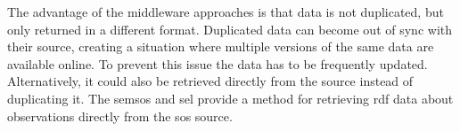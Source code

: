 The advantage of the middleware approaches is that data is not duplicated, but only returned in a different format. Duplicated data can become out of sync with their source, creating a situation where multiple versions of the same data are available online. To prevent this issue the data has to be frequently updated. Alternatively, it could also be retrieved directly from the source instead of duplicating it. The \ac{semsos} and \ac{sel} provide a method for retrieving \ac{rdf} data about observations directly from the \ac{sos} source.

   
